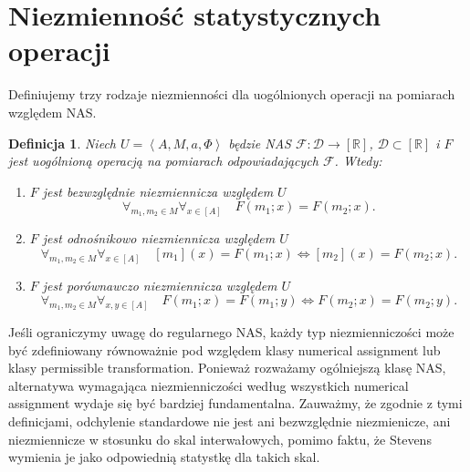 \documentclass[12pt,a4paper]{report}
\newtheorem{definition}{Definicja}[chapter]
\newcommand{\domkniecie}[1]{\left\lbrack{#1}\right\rbrack}
\newcommand{\tuple}[1]{\left\langle {#1} \right\rangle}
\begin{document}
\section{Niezmienność statystycznych operacji}
Definiujemy trzy rodzaje niezmienności dla uogólnionych operacji na pomiarach względem NAS. 
\begin{definition}
Niech $U=\tuple{A,M,a,\Phi}$ będzie NAS $\mathcal{F}:\mathcal{D}\to\domkniecie{\mathbb{R}}$, $\mathcal{D}\subset \domkniecie{\mathbb{R}}$ i $F$ jest uogólnioną operacją na pomiarach odpowiadających $\mathcal{F}$. Wtedy:
\begin{enumerate}
\item
$F$ jest bezwzględnie niezmiennicza względem $U$ 
$$
\forall_{m_{1}, m_{2} \in M}  \forall_{x \in \domkniecie{A}} \quad F(m_{1};x)=F(m_{2};x).
$$
\item
$F$ jest odnośnikowo niezmiennicza względem $U$  
$$
\forall_{m_{1}, m_{2} \in M}\forall_{x \in \domkniecie{A}} \quad \domkniecie{m_{1}}(x)=F(m_{1};x) \iff \domkniecie{m_{2}}(x)=F(m_{2};x).
$$
\item
$F$ jest porównawczo niezmiennicza względem $U$ 
$$
\forall_{m_1, m_2 \in M}  \forall_{x,y \in \domkniecie{A}} \quad F(m_{1};x)=F(m_{1};y) \iff F(m_{2};x)=F(m_{2};y).
$$
\end{enumerate} 
\end{definition}

Jeśli ograniczymy uwagę do regularnego NAS, każdy typ niezmienniczości może być zdefiniowany równoważnie pod względem klasy numerical assignment lub klasy permissible transformation. Ponieważ rozważamy ogólniejszą klasę NAS, alternatywa wymagająca niezmienniczości według wszystkich numerical assignment wydaje się być bardziej fundamentalna. Zauważmy, że zgodnie z tymi definicjami, odchylenie standardowe nie jest ani bezwzględnie niezmienicze, ani niezmiennicze w stosunku do skal interwałowych, pomimo faktu, że Stevens wymienia je jako odpowiednią statystkę dla takich skal.
\end{document}
